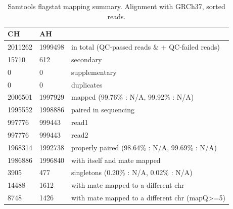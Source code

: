 \documentclass{article}
\begin{document}
\begin{center}	
\begin{table}
\caption{Samtools flagstat mapping summary. Alignment with GRCh37, sorted reads.}			
\begin{tabular}{ l l l } 				
 \hline				
CH	 & 	AH 	 & 	 \\
 \hline				
2011262	 & 	1999498	 & 	in total (QC-passed reads \& + QC-failed reads) \\ 
15710	 & 	612	 & 	secondary \\ 
0	 & 	0	 & 	supplementary \\ 
0	 & 	0	 & 	duplicates \\ 
2006501	 & 	1997929	 & 	mapped (99.76\% : N/A, 99.92\% : N/A) \\ 
1995552	 & 	1998886	 & 	paired in sequencing \\ 
997776	 & 	999443	 & 	read1 \\ 
997776	 & 	999443	 & 	read2 \\ 
1968314	 & 	1992738	 & 	properly paired (98.64\% : N/A, 99.69\% : N/A) \\ 
1986886	 & 	1996840	 & 	with itself and mate mapped \\ 
3905	 & 	477	 & 	singletons (0.20\% : N/A, 0.02\% : N/A) \\ 
14488	 & 	1612	 & 	with mate mapped to a different chr \\ 
8748	 & 	1426	 & 	with mate mapped to a different chr (mapQ>=5) \\ 
\hline				
\end{tabular}				
\label{table:1}
\end{table}
\end{center}	
\end{document}
